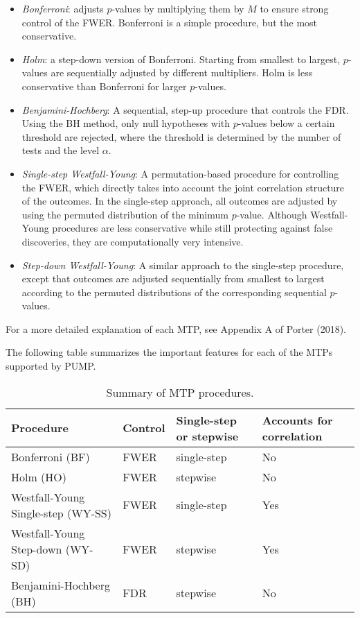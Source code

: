 \documentclass[
]{article}
\providecommand{\tightlist}{%
  \setlength{\itemsep}{0pt}\setlength{\parskip}{0pt}}
\begin{document}
\begin{itemize}
\tightlist
\item
  \emph{Bonferroni}: adjusts \(p\)-values by multiplying them by \(M\)
  to ensure strong control of the FWER. Bonferroni is a simple
  procedure, but the most conservative.
\item
  \emph{Holm}: a step-down version of Bonferroni. Starting from smallest
  to largest, \(p\)-values are sequentially adjusted by different
  multipliers. Holm is less conservative than Bonferroni for larger
  \(p\)-values.
\item
  \emph{Benjamini-Hochberg}: A sequential, step-up procedure that
  controls the FDR. Using the BH method, only null hypotheses with
  \(p\)-values below a certain threshold are rejected, where the
  threshold is determined by the number of tests and the level
  \(\alpha\).
\item
  \emph{Single-step Westfall-Young}: A permutation-based procedure for
  controlling the FWER, which directly takes into account the joint
  correlation structure of the outcomes. In the single-step approach,
  all outcomes are adjusted by using the permuted distribution of the
  minimum \(p\)-value. Although Westfall-Young procedures are less
  conservative while still protecting against false discoveries, they
  are computationally very intensive.
\item
  \emph{Step-down Westfall-Young}: A similar approach to the single-step
  procedure, except that outcomes are adjusted sequentially from
  smallest to largest according to the permuted distributions of the
  corresponding sequential \(p\)-values.
\end{itemize}

For a more detailed explanation of each MTP, see Appendix A of Porter
(2018).

The following table summarizes the important features for each of the
MTPs supported by PUMP.

\begin{table}[h!]
\centering
\begin{tabular}{l l l l}
Procedure                             & Control & Single-step or stepwise & Accounts for correlation \\ \hline
Bonferroni (BF)                       & FWER    & single-step             & No                       \\
Holm (HO)                             & FWER    & stepwise                & No\\
Westfall-Young Single-step (WY-SS)    & FWER    & single-step             & Yes\\
Westfall-Young Step-down (WY-SD)      & FWER    & stepwise                & Yes\\
Benjamini-Hochberg (BH)               & FDR     & stepwise                & No
\end{tabular}
\caption{Summary of MTP procedures.}
  \label{tab:mtp}
\end{table}
\end{document}
